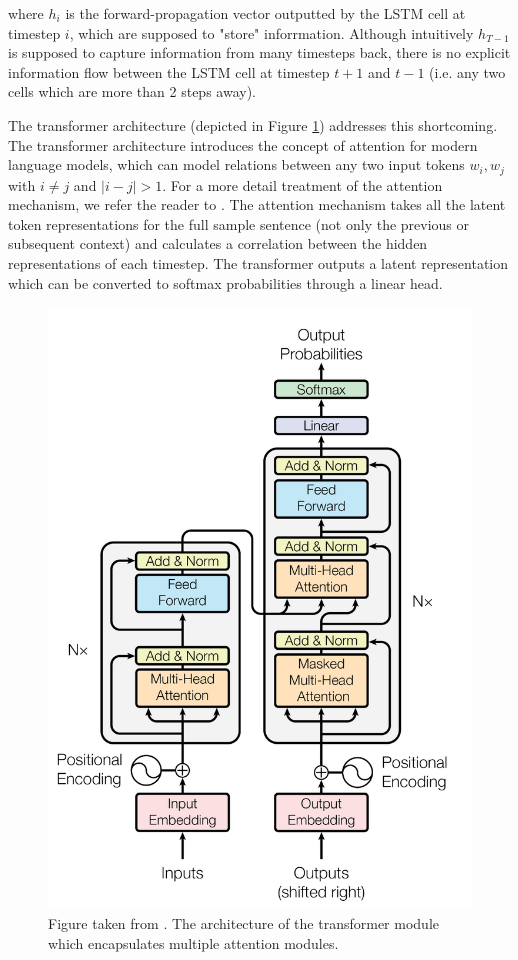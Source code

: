 \documentclass[a4paper,12pt,oneside,openright]{report}
\begin{document}
where $h_{i}$ is the forward-propagation vector outputted by the LSTM cell at timestep $i$, which are supposed to "store" inforrmation.
Although intuitively $h_{T-1}$ is supposed to capture information from many timesteps back, there is no explicit information flow between the LSTM cell at timestep $t+1$ and $t-1$ (i.e. any two cells which are more than 2 steps away).

The transformer architecture \cite{vaswani17} (depicted in Figure \ref{fig:attention_is_all_you_need}) addresses this shortcoming.
The transformer architecture introduces the concept of attention for modern language models, which can model relations between any two input tokens $w_i, w_j$ with $i \neq j$ and $| i - j |  > 1$.
For a more detail treatment of the attention mechanism, we refer the reader to \cite{bahdanau16}.
The attention mechanism takes all the latent token representations for the full sample sentence (not only the previous or subsequent context) and calculates a correlation between the hidden representations of each timestep.
The transformer outputs a latent representation which can be converted to softmax probabilities through a linear head.

\begin{figure}[H]
	\center
  \includegraphics[width=0.5\linewidth]{./assets/background/transformer_module.png}
  \caption{Figure taken from \cite{vaswani17}. The architecture of the transformer module which encapsulates multiple attention modules.}
  \label{fig:attention_is_all_you_need}
\end{figure}
\end{document}
